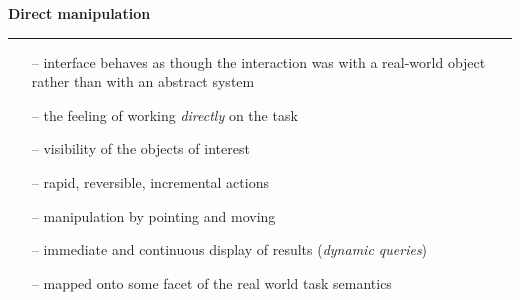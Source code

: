 \documentclass[pdf]{beamer}
\begin{document}
\begin{frame}
{\textbf{Direct manipulation}}{\textcolor{red}{\rule{12cm}{1.2pt}}}

     \begin{itemize}
      \item[--] {interface behaves as though the interaction was with a real-world object rather than with an abstract system}
      \item[--]{ the feeling of working \textit{directly} on the task}
    \end{itemize}
    \vspace{10px}
    
     \begin{itemize}
      \item[--]{ visibility of the objects of interest}
      \item[--]{ rapid, reversible, incremental actions}
      \item[--]{ manipulation by pointing and moving}
      \item[--]{ immediate and continuous display of results (\textit{dynamic queries})}
    \end{itemize}
    \vspace{10px}
    
     \begin{itemize}
      \item[--]{ mapped onto some facet of the real world task semantics}
    \end{itemize}

\end{frame}
\end{document}
